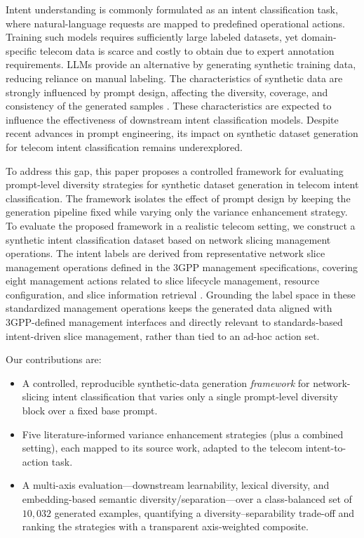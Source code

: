 \documentclass[conference]{IEEEtran}
\begin{document}
Intent understanding is commonly formulated as an intent classification task, where natural-language requests are mapped to predefined operational actions. Training such models requires sufficiently large labeled datasets, yet domain-specific telecom data is scarce and costly to obtain due to expert annotation requirements. LLMs provide an alternative by generating synthetic training data, reducing reliance on manual labeling. The characteristics of synthetic data are strongly influenced by prompt design, affecting the diversity, coverage, and consistency of the generated samples \cite{nadasSynthetic}. These characteristics are expected to influence the effectiveness of downstream intent classification models. Despite recent advances in prompt engineering, its impact on synthetic dataset generation for telecom intent classification remains underexplored.

To address this gap, this paper proposes a controlled framework for evaluating prompt-level diversity strategies for synthetic dataset generation in telecom intent classification. The framework isolates the effect of prompt design by keeping the generation pipeline fixed while varying only the variance enhancement strategy. To evaluate the proposed framework in a realistic telecom setting, we construct a synthetic intent classification dataset based on network slicing management operations. The intent labels are derived from representative network slice management operations defined in the 3GPP management specifications, covering eight management actions related to slice lifecycle management, resource configuration, and slice information retrieval \cite{3gpp28531}. Grounding the label space in these standardized management operations keeps the generated data aligned with 3GPP-defined management interfaces and directly relevant to standards-based intent-driven slice management, rather than tied to an ad-hoc action set.

Our contributions are:
\begin{itemize}
    \item A controlled, reproducible synthetic-data generation \emph{framework} for network-slicing intent classification that varies only a single prompt-level diversity block over a fixed base prompt.
    \item Five literature-informed variance enhancement strategies (plus a combined setting), each mapped to its source work, adapted to the telecom intent-to-action task.
    \item A multi-axis evaluation---downstream learnability, lexical diversity, and embedding-based semantic diversity/separation---over a class-balanced set of $10{,}032$ generated examples, quantifying a diversity--separability trade-off and ranking the strategies with a transparent axis-weighted composite.
\end{itemize}
\end{document}
